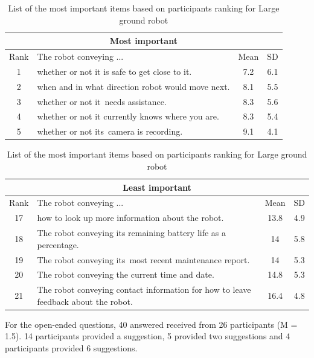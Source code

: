 \documentclass[letterpaper, 10 pt, conference]{ieeeconf}  %
\begin{document}
\begin {table}[h]
\begin{center}
\label{table:fetch}
\begin{tabular}{|c|p{150pt}|c|c|}
 \hline
 \multicolumn{4}{|c|}{Most important} \\
 \hline
  Rank & The robot conveying ... & Mean & SD \\
 \hline
   \rowcolor{Gray}
1 & whether or not it is safe to get close to it. & 7.2 & 6.1\\
 \hline
2 & when and in what direction robot would move next. & 8.1 & 5.5\\
 \hline
3 & whether or not it needs assistance. & 8.3 & 5.6\\
 \hline
4 & whether or not it currently knows where you are. & 8.3 & 5.4\\
 \hline
5 & whether or not its camera is recording. & 9.1 & 4.1\\
 \hline
\end{tabular}

\vspace*{0.5 cm}

\begin{tabular}{|c|p{150pt}|c|c|}
 \hline
  \multicolumn{4}{|c|}{Least important} \\
 \hline
  Rank & The robot conveying ... & Mean & SD \\
 \hline
 
   \rowcolor{Gray}
17 & how to look up more information about the robot. & 13.8 & 4.9\\
\hline
   \rowcolor{Gray}
18 & The robot conveying its remaining battery life as a percentage. & 14 & 5.8\\
\hline
   \rowcolor{Gray}
19 & The robot conveying its most recent maintenance report. & 14 & 5.3\\
\hline
   \rowcolor{Gray}
20 & The robot conveying the current time and date. & 14.8 & 5.3\\
\hline
   \rowcolor{Gray}
21 & The robot conveying contact information for how to leave feedback about the robot. & 16.4 & 4.8\\
\hline
\end{tabular}
\end{center}

\caption{List of the most important items based on participants ranking for Large ground robot}
\end{table}

For the open-ended questions, 40 answered received from 26 participants (M = 1.5). 14 participants provided a suggestion, 5 provided two suggestions and 4 participants provided 6 suggestions.
\end{document}
